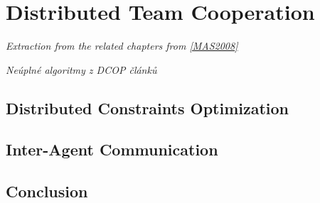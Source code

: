 \chapter{Distributed Team Cooperation}
\emph{Extraction from the related chapters from \ref{MAS2008}}

\emph{Neúplné algoritmy z DCOP článků}

\section{Distributed Constraints Optimization}

\section{Inter-Agent Communication}

\section{Conclusion}
